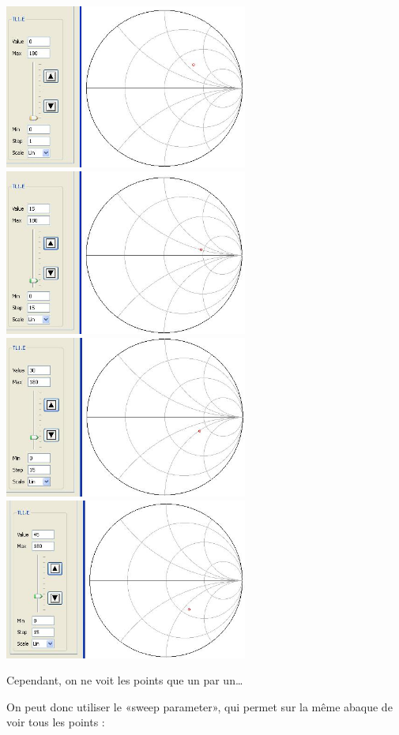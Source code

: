 \documentclass[10pt]{article}
\begin{document}
   \includegraphics[width=8cm]{I2_c-0.jpg}
   \includegraphics[width=8cm]{I2_c-15.jpg}
   \includegraphics[width=8cm]{I2_c-30.jpg}
   \includegraphics[width=8cm]{I2_c-45.jpg}


   \newpage
   Cependant, on ne voit les points que un par un…

   On peut donc utiliser le «sweep parameter», qui permet sur la même abaque de voir tous les points :
   
\end{document}
